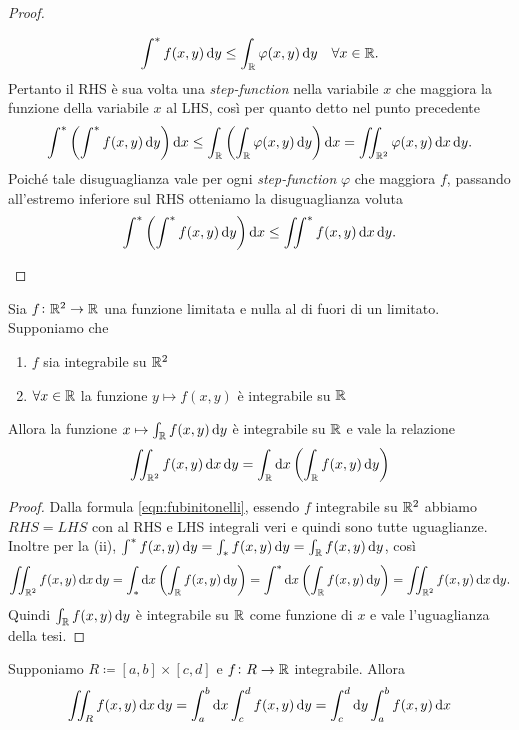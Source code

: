 \begin{proof}
\begin{enumerate}
		\[
			\int^{*} f(x, y) \dif{y} \leq \int_{\R} \varphi(x, y) \dif{y} \quad \forall x \in \R.
		\]
		Pertanto il RHS è sua volta una \emph{step-function} nella variabile $ x $ che maggiora la funzione della variabile $ x $ al LHS, così per quanto detto nel punto precedente
		\[
			\int^{*} \left(\int^{*} f(x, y) \dif{y}\right) \dif{x} \leq \int_{\R} \left(\int_{\R} \varphi(x, y) \dif{y}\right) \dif{x} = \iint_{\R^2} \varphi(x, y) \dif{x} \dif{y}. 
		\]
		Poiché tale disuguaglianza vale per ogni \emph{step-function} $ \varphi $ che maggiora $ f $, passando all'estremo inferiore sul RHS otteniamo la disuguaglianza voluta 
		\[
			\int^{*} \left(\int^{*} f(x, y) \dif{y}\right) \dif{x} \leq \iint^{*} f(x, y) \dif{x} \dif{y}. \qedhere
		\]
	\end{enumerate}
\end{proof}

\begin{corollary}
	Sia $ f \colon \mathbb{R}^2 \to \mathbb{R} $ una funzione limitata e nulla al di fuori di un limitato. Supponiamo che 
	\begin{enumerate}[label = (\roman*)]
		\item $ f $ sia integrabile su $ \mathbb{R}^2 $ 
		\item $ \forall x \in \mathbb{R} $ la funzione $ y \mapsto f(x, y) $ è integrabile su $ \mathbb{R} $
	\end{enumerate}
	Allora la funzione $ x \mapsto \int_{\R} f(x, y) \dif{y} $ è integrabile su $ \mathbb{R} $ e vale la relazione
	\begin{equation}
		\iint_{\R^2} f(x, y) \dif{x} \dif{y} = \int_{\R} \dif{x} \left( \int_{\R} f(x, y) \dif{y}\right)
	\end{equation}
\end{corollary}
%
\begin{proof}
	Dalla formula \eqref{eqn:fubinitonelli}, essendo $ f $ integrabile su $ \mathbb{R}^2 $ abbiamo $ RHS = LHS $ con al RHS e LHS integrali veri e quindi sono tutte uguaglianze. Inoltre per la (ii), $ \int^{*} f(x, y) \dif{y} = \int_{*} f(x, y) \dif{y} = \int_{\R} f(x, y) \dif{y} $, così
	\[
		\iint_{\R^2} f(x, y) \dif{x} \dif{y} = \int_{*} \dif{x}\left(\int_{\R} f(x, y) \dif{y}\right) = \int^{*} \dif{x}\left(\int_{\R} f(x, y) \dif{y}\right) = \iint_{\R^2} f(x, y) \dif{x} \dif{y}.
	\]
	Quindi $ \int_{\R} f(x, y) \dif{y} $ è integrabile su $ \mathbb{R} $ come funzione di $ x $ e vale l'uguaglianza della tesi. 
\end{proof}

\begin{prop}
	Supponiamo $ R \coloneqq [a, b] \times [c, d] $ e $ f \colon R \to \mathbb{R} $ integrabile. Allora 
	\begin{equation}
		\iint_{R} f(x, y) \dif{x} \dif{y} = \int_{a}^{b} \dif{x} \int_{c}^{d} f(x, y) \dif{y}  = \int_{c}^{d} \dif{y} \int_{a}^{b} f(x, y) \dif{x} 
	\end{equation}
\end{prop}

